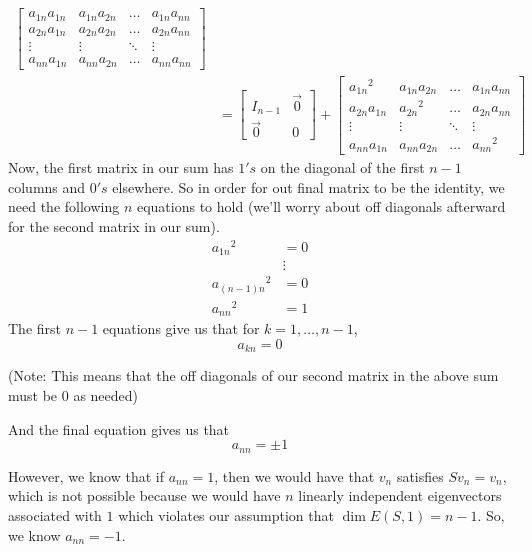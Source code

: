 \documentclass[answers]{exam}
\begin{document}
\begin{questions}
\begin{parts}
\begin{solution}
\begin{align*}
\begin{bmatrix}
                        a_{1n}{a_{1n}} & a_{1n}{a_{2n}} & \dots & a_{1n}{a_{nn}} \\
                        a_{2n}{a_{1n}} & a_{2n}{a_{2n}} & \dots & a_{2n}{a_{nn}} \\
                        \vdots & \vdots &\ddots & \vdots \\
                        a_{nn}{a_{1n}} & a_{nn}{a_{2n}} & \dots & a_{nn}{a_{nn}} 
                    \end{bmatrix} \\
                &= \begin{bmatrix} I_{n-1} & \vec{0} \\
                    \vec{0} & 0\end{bmatrix} + 
                    \begin{bmatrix}
                        {a_{1n}}^2 & a_{1n}{a_{2n}} & \dots & a_{1n}{a_{nn}} \\
                        a_{2n}{a_{1n}} & {a_{2n}}^2 & \dots & a_{2n}{a_{nn}} \\
                        \vdots & \vdots &\ddots & \vdots \\
                        a_{nn}{a_{1n}} & a_{nn}{a_{2n}} & \dots & {a_{nn}}^2 
                    \end{bmatrix}
            \end{align*}
            Now, the first matrix in our sum has $1's$ on the diagonal of the first $n-1$ columns and $0's$ 
            elsewhere. So in order for out final matrix to be the identity, we need the following $n$ equations to
            hold (we'll worry about off diagonals afterward for the second matrix in our sum).
            \begin{align*}
                {a_{1n}}^2 &= 0 \\
                &\vdots\\
                {a_{(n-1)n}}^2 &= 0 \\
                {a_{nn}}^2 &= 1
            \end{align*}
            The first $n-1$ equations give us that for $k=1,\dots,n-1$,
            \[
                a_{kn} = 0
            \]

            (Note: This means that the off diagonals of our second matrix in the above sum must be $0$ as needed)

            And the final equation gives us that
            \[
                a_{nn} = \pm 1
            \]

            However, we know that if $a_{nn} = 1$, then we would have that $v_n$ satisfies $Sv_n = v_n$, which
            is not possible because we would have $n$ linearly independent eigenvectors associated with $1$ which
            violates our assumption that $\dim E(S,1) = n-1$. So, we know $a_{nn} = -1$. 


\end{solution}
\end{parts}
\end{questions}
\end{document}
